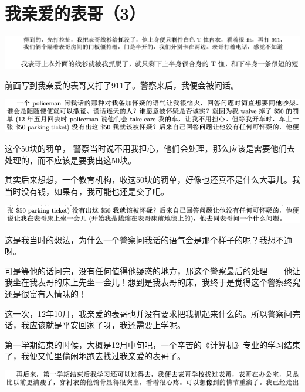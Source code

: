 \documentclass[9pt, b5paper]{article}
\begin{document}
\section{我亲爱的表哥（3）}
\label{sec:orgd1037ff}

\begin{center}
\includegraphics[width=.9\linewidth]{./pic/backups_plans_20210506_094808.png}
\end{center}

前面写到我亲爱的表哥又打了911了。警察来后，我便会被问话。

\begin{center}
\includegraphics[width=.9\linewidth]{./pic/backups_plans_20210505_203728.png}
\end{center}

这个50块的罚单， 警察当时说不用我担心，他们会处理，那么应该是需要他们去处理的，而不应该是要我出这50块。

其实后来想想，一个教育机构，收这50块的罚单，好像也还真不是什么大事儿。我当时没有钱，如果有，我可能也还是交了吧。 

\begin{center}
\includegraphics[width=.9\linewidth]{./pic/backups_plans_20210505_203929.png}
\end{center}

这是我当时的想法，为什么一个警察问我话的语气会是那个样子的呢？我想不通呀。 

可是等他的话问完，没有任何值得他疑惑的地方，那这个警察最后的处理——他让我坐在我表哥的床上先坐一会儿！想到是我表哥的床，我终于是觉得这个警察终究还是很富有人情味的！

这一次，12年10月，我亲爱的表哥也并没有要求把我抓起来什么的。所以警察问完话，我应该就是平安回家了呀，我还需要上学呢。 

第一学期结束的时候，大概是12月中旬吧，一个辛苦的《计算机》专业的学习结束了，我便又忙里偷闲地跑去找过我亲爱的表哥了。 

\begin{center}
\includegraphics[width=.9\linewidth]{./pic/backups_plans_20210505_204248.png}
\end{center}
\end{document}
